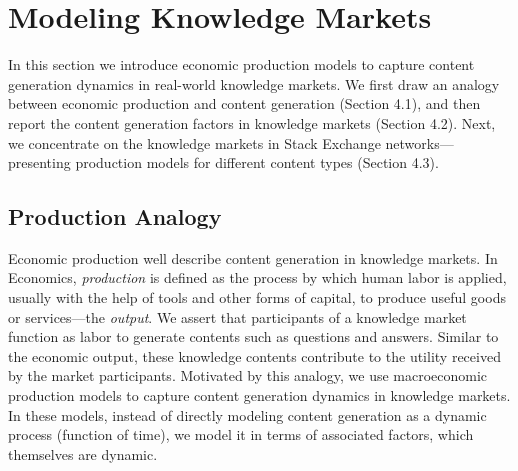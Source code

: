 \section{Modeling Knowledge Markets}
In this section we introduce economic production models to capture content generation dynamics in real-world knowledge markets. We first draw an analogy between economic production and content generation (Section 4.1), and then report the content generation factors in knowledge markets (Section 4.2). Next, we concentrate on the knowledge markets in Stack Exchange networks---presenting production models for different content types (Section 4.3).

\subsection{Production Analogy} 
Economic production well describe content generation in knowledge markets. In Economics, \emph{production} is defined as the process by which human labor is applied, usually with the help of tools and other forms of capital, to produce useful goods or services---the \emph{output}. We assert that participants of a knowledge market function as labor to generate contents such as questions and answers. Similar to the economic output, these knowledge contents contribute to the utility received by the market participants. Motivated by this analogy, we use macroeconomic production models to capture content generation dynamics in knowledge markets. In these models, instead of directly modeling content generation as a dynamic process (function of time), we model it in terms of associated factors, which themselves are dynamic.



